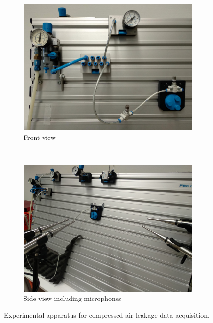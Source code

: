 \begin{figure}[h]
	\centering
    \begin{subfigure}[t]{0.48\columnwidth}
        \centering
        \includegraphics[width=\columnwidth]{images/apparatus_front.jpg}
        \caption{Front view}
        \label{fig:sys-front}
    \end{subfigure}%
    ~ 
    \begin{subfigure}[t]{0.48\columnwidth}
        \centering
        \includegraphics[width=\columnwidth]{images/apparatus_side_angle.jpg}
        \caption{Side view including microphones}
        \label{fig:sys-side}
    \end{subfigure}
	\caption{Experimental apparatus for compressed air leakage data acquisition.}
	\label{fig:sys}
\end{figure}

